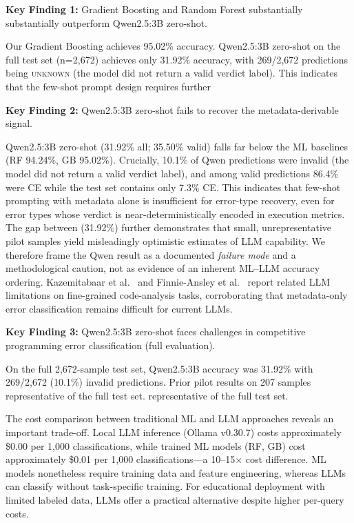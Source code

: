 \documentclass[acmsmall]{acmart}
\begin{document}
\textbf{Key Finding 1:} Gradient Boosting and Random Forest substantially
substantially outperform Qwen2.5:3B zero-shot.

Our Gradient Boosting achieves 95.02\% accuracy. Qwen2.5:3B zero-shot on the
full test set (n=2,672) achieves only 31.92\% accuracy, with 269/2,672
predictions being \textsc{unknown} (the model did not return a valid verdict
label). This indicates that the few-shot prompt design requires further

\textbf{Key Finding 2:} Qwen2.5:3B zero-shot fails to recover the
metadata-derivable signal.

Qwen2.5:3B zero-shot (31.92\% all; 35.50\% valid) falls far below the ML baselines
(RF 94.24\%, GB 95.02\%). Crucially, 10.1\% of Qwen predictions
were invalid (the model did not return a valid verdict label), and among
valid predictions 86.4\% were CE while the test set contains only 7.3\%
CE. This indicates that few-shot prompting with metadata alone is
insufficient for error-type recovery, even for error types whose verdict
is near-deterministically encoded in execution metrics. The gap between
(31.92\%) further demonstrates that small, unrepresentative pilot samples
yield misleadingly optimistic estimates of LLM capability. We therefore
frame the Qwen result as a documented \emph{failure mode} and a
methodological caution, not as evidence of an inherent ML--LLM accuracy
ordering. Kazemitabaar et al.~\cite{kazemitabaar2024impact} and
Finnie-Ansley et al.~\cite{finnie2022robots} report related LLM
limitations on fine-grained code-analysis tasks, corroborating that
metadata-only error classification remains difficult for current LLMs.

\textbf{Key Finding 3:} Qwen2.5:3B zero-shot faces challenges in competitive
programming error classification (full evaluation).

On the full 2,672-sample test set, Qwen2.5:3B accuracy was 31.92\% with
269/2,672 (10.1\%) invalid predictions. Prior pilot results on 207 samples
representative of the full test set.
representative of the full test set.

The cost comparison between traditional ML and LLM approaches reveals an
important trade-off. Local LLM inference (Ollama v0.30.7) costs approximately \$0.00 per 1,000
classifications, while trained ML models (RF, GB) cost approximately \$0.01
per 1,000 classifications---a 10--15$\times$ cost difference. ML models
nonetheless require training data and feature engineering, whereas LLMs can
classify without task-specific training. For educational deployment with
limited labeled data, LLMs offer a practical alternative despite higher
per-query costs.
\end{document}
